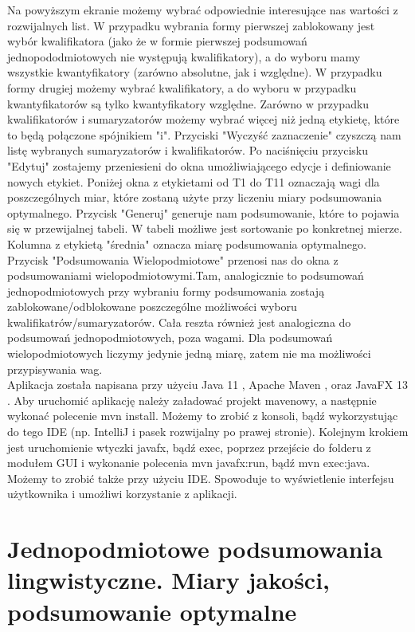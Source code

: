 \documentclass{classrep}
\begin{document}
Na powyższym ekranie możemy wybrać odpowiednie interesujące nas wartości z rozwijalnych list. W przypadku wybrania formy pierwszej zablokowany jest wybór kwalifikatora (jako że w formie pierwszej podsumowań jednopododmiotowych nie występują kwalifikatory), a do wyboru mamy wszystkie kwantyfikatory (zarówno absolutne, jak i względne). W przypadku formy drugiej możemy wybrać kwalifikatory, a do wyboru w przypadku kwantyfikatorów są tylko kwantyfikatory względne. Zarówno w przypadku kwalifikatorów i sumaryzatorów możemy wybrać więcej niż jedną etykietę, które to będą połączone spójnikiem "i". Przyciski "Wyczyść zaznaczenie" czyszczą nam listę wybranych sumaryzatorów i kwalifikatorów. Po naciśnięciu przycisku "Edytuj" zostajemy przeniesieni do okna umożliwiającego edycje i definiowanie nowych etykiet. Poniżej okna z etykietami od T1 do T11 oznaczają wagi dla poszczególnych miar, które zostaną użyte przy liczeniu miary podsumowania optymalnego. Przycisk "Generuj" generuje nam podsumowanie, które to pojawia się w przewijalnej tabeli. W tabeli możliwe jest sortowanie po konkretnej mierze. Kolumna z etykietą "średnia" oznacza miarę podsumowania optymalnego. Przycisk "Podsumowania Wielopodmiotowe" przenosi nas do okna z podsumowaniami wielopodmiotowymi.Tam, analogicznie to podsumowań jednopodmiotowych przy wybraniu formy podsumowania zostają zablokowane/odblokowane poszczególne możliwości wyboru kwalifikatrów/sumaryzatorów. Cała reszta również jest analogiczna do podsumowań jednopodmiotowych, poza wagami. Dla podsumowań wielopodmiotowych liczymy jedynie jedną miarę, zatem nie ma możliwości przypisywania wag.
\\
Aplikacja została napisana przy użyciu Java 11 \cite{java_doc}, Apache Maven \cite{maven_doc}, oraz JavaFX 13 \cite{javafx_doc}. Aby uruchomić aplikację należy załadować projekt mavenowy, a następnie wykonać polecenie mvn install. Możemy to zrobić z konsoli, bądź wykorzystując do tego IDE (np. IntelliJ i pasek rozwijalny po prawej stronie). Kolejnym krokiem jest uruchomienie wtyczki javafx, bądź exec, poprzez przejście do folderu z modułem GUI i wykonanie polecenia mvn javafx:run, bądź mvn exec:java. Możemy to zrobić także przy użyciu IDE. Spowoduje to wyświetlenie interfejsu użytkownika i umożliwi korzystanie z aplikacji.

\section{ Jednopodmiotowe podsumowania lingwistyczne. Miary jakości, podsumowanie optymalne}
\end{document}
